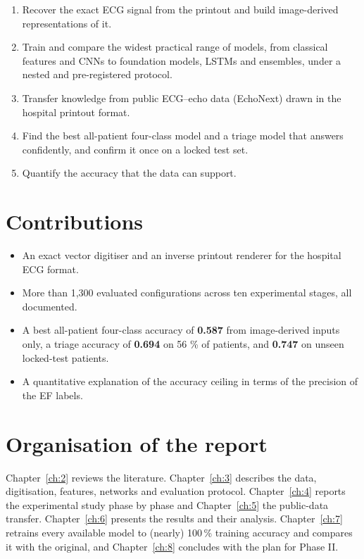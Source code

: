 \begin{enumerate}
  \item Recover the exact ECG signal from the printout and build image-derived representations of it.
  \item Train and compare the widest practical range of models, from classical features and CNNs to foundation models, LSTMs and ensembles, under a nested and pre-registered protocol.
  \item Transfer knowledge from public ECG--echo data (EchoNext) drawn in the hospital printout format.
  \item Find the best all-patient four-class model and a triage model that answers confidently, and confirm it once on a locked test set.
  \item Quantify the accuracy that the data can support.
\end{enumerate}
\section{Contributions}\label{sec:1.4}

\begin{itemize}
  \item An exact vector digitiser and an inverse printout renderer for the hospital ECG format.
  \item More than 1,300 evaluated configurations across ten experimental stages, all documented.
  \item A best all-patient four-class accuracy of \textbf{0.587} from image-derived inputs only, a triage accuracy of \textbf{0.694} on 56 \% of patients, and \textbf{0.747} on unseen locked-test patients.
  \item A quantitative explanation of the accuracy ceiling in terms of the precision of the EF labels.
\end{itemize}
\section{Organisation of the report}\label{sec:1.5}

Chapter~\ref{ch:2} reviews the literature. Chapter~\ref{ch:3} describes the data, digitisation, features, networks and evaluation protocol. Chapter~\ref{ch:4} reports the experimental study phase by phase and Chapter~\ref{ch:5} the public-data transfer. Chapter~\ref{ch:6} presents the results and their analysis. Chapter~\ref{ch:7} retrains every available model to (nearly) 100\,\% training accuracy and compares it with the original, and Chapter~\ref{ch:8} concludes with the plan for Phase II.

